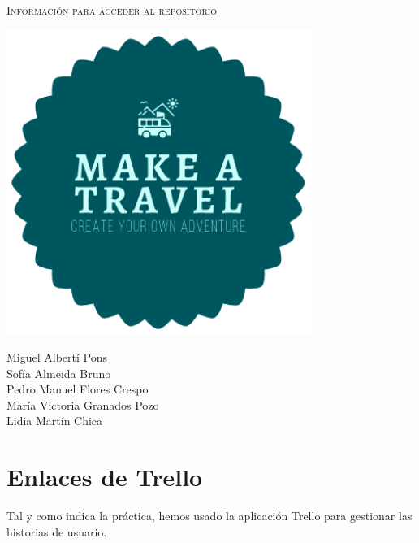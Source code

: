 \documentclass[11pt]{article}
\begin{document}
\begin{titlepage}
\centering
\vspace{4.5cm}
{\scshape\LARGE Información para acceder al repositorio \par}
\vspace{1.5cm}

\includegraphics[width=10cm]{Logo}

\vspace{3cm}
{\scshape\large \par}
\vspace{1cm}

{Miguel Albertí Pons\\
Sofía Almeida Bruno\\
Pedro Manuel Flores Crespo\\
María Victoria Granados Pozo\\
Lidia Martín Chica
\par}

\end{titlepage}
\newpage

\section{Enlaces de Trello}
Tal y como indica la práctica, hemos usado la aplicación Trello para gestionar las historias de usuario. 
\end{document}
